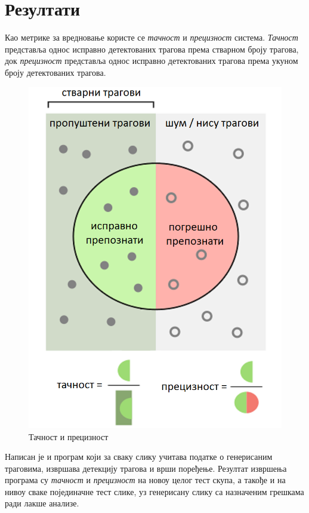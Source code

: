 \documentclass[11pt,a4paper,serbian,oneside]{book}
\begin{document}
\section{Резултати}

Као метрике за вредновање користе се \textit{тачност} и \textit{прецизност} система. \textit{Тачност} пред\-став\-ља однос исправно детектованих трагова према стварном броју трагова, док \textit{прецизност} представља однос исправно детектованих трагова према укуном броју детектованих трагова.

\begin{figure}[H]
\begin{center}
\includegraphics[width=120mm]{images/recall_prec.png}
\end{center}
\caption{Тачност и прецизност}
\label{fig:recall_prec}
\end{figure}

Написан је и програм који за сваку слику учитава податке о генерисаним траговима, извршава детекцију трагова и врши поређење. Резултат извршења програма су \textit{тачност} и \textit{прецизност} на новоу целог тест скупа, а такође и на нивоу сваке појединачне тест слике, уз генерисану слику са назначеним грешкама ради лакше анализе.
\end{document}
